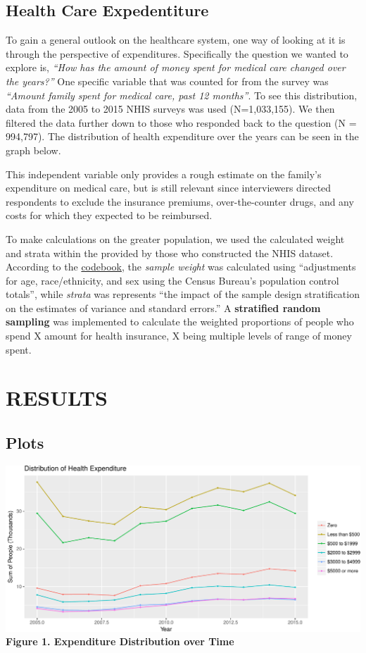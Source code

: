 \documentclass[10pt,]{article}
\makeatletter
\def\maxwidth{\ifdim\Gin@nat@width>\linewidth\linewidth
\else\Gin@nat@width\fi}
\let\Oldincludegraphics\includegraphics
\renewcommand{\includegraphics}[1]{\Oldincludegraphics[width=\maxwidth]{#1}}
\makeatother
\begin{document}
\subsection{\texorpdfstring{\textbf{Health Care
Expedentiture}}{Health Care Expedentiture}}\label{health-care-expedentiture}

To gain a general outlook on the healthcare system, one way of looking
at it is through the perspective of expenditures. Specifically the
question we wanted to explore is, \emph{``How has the amount of money
spent for medical care changed over the years?''} One specific variable
that was counted for from the survey was \emph{``Amount family spent for
medical care, past 12 months''}. To see this distribution, data from the
2005 to 2015 NHIS surveys was used (N=1,033,155). We then filtered the
data further down to those who responded back to the question (N =
994,797). The distribution of health expenditure over the years can be
seen in the graph below.

This independent variable only provides a rough estimate on the family's
expenditure on medical care, but is still relevant since interviewers
directed respondents to exclude the insurance premiums, over-the-counter
drugs, and any costs for which they expected to be reimbursed.

To make calculations on the greater population, we used the calculated
weight and strata within the provided by those who constructed the NHIS
dataset. According to the \href{https://ihis.ipums.org/}{codebook}, the
\emph{sample weight} was calculated using ``adjustments for age,
race/ethnicity, and sex using the Census Bureau's population control
totals'', while \emph{strata} was represents ``the impact of the sample
design stratification on the estimates of variance and standard
errors.'' A \textbf{stratified random sampling} was implemented to
calculate the weighted proportions of people who spend X amount for
health insurance, X being multiple levels of range of money spent.

\section{RESULTS}\label{results}

\subsection{\texorpdfstring{\textbf{Plots}}{Plots}}\label{plots}

\includegraphics{paper_files/figure-latex/expenddistribution-1.pdf}
\textbf{Figure 1. Expenditure Distribution over Time}
\end{document}
